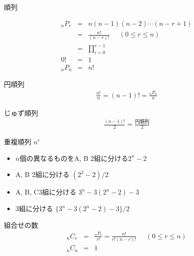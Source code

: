 \documentclass[aspectratio=169, 12pt]{beamer} %
\begin{document}
\begin{frame}{順列}
    \begin{center}

        \begin{eqnarray*}
            _nP_r&=&n(n-1)(n-2)\cdots (n-r+1) \\
            &=&\frac{n!}{(n-r)!} \;\;\;\;\;(0\leq r \leq n) \\
            &=&\prod_{i=0}^{r-1} \\
            0! &=& 1 \\
            _nP_n&=&n!
        \end{eqnarray*}
    \end{center}
\end{frame}
\begin{frame}{円順列}
    \begin{eqnarray*}
        \frac{n!}{n}=(n-1)! = \frac{_nP_n}{n}
    \end{eqnarray*}
\end{frame}
\begin{frame}{じゅず順列}
    \begin{eqnarray*}
        \frac{(n-1)!}{2}=\frac{円順列}{2}
    \end{eqnarray*}
\end{frame}
\begin{frame}{重複順列 $n^r$}
    \begin{itemize}
        \item $n$個の異なるものをA, B \space2組に分ける$2^n-2$
        \item A, B 2組に分ける $(2^2-2)/2$
        \item A, B, C\space3組に分ける $3^n-3(2^n-2)-3$
        \item 3組に分ける $\{3^n-3(2^n-2)-3\}/2$
    \end{itemize}
\end{frame}
\begin{frame}{組合せの数}
    \begin{eqnarray*}
        _nC_r&=&\frac{_nP_r}{r!}=\frac{n!}{r!(n-r)!} \;\;\;\;\;(0\leq r \leq n) \\
        _nC_n&=&1
    \end{eqnarray*}
\end{frame}
\end{document}
